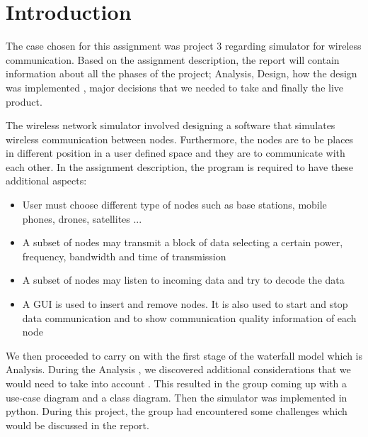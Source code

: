 \chapter{Introduction}\label{ch:introduction}

The case chosen for this assignment was project 3 regarding simulator for wireless communication. Based on the assignment description, the report will contain information about all the phases of the project; Analysis, Design, how the design was implemented , major decisions that we needed to take and finally the live product.\newline

The wireless network simulator involved designing a software that simulates wireless communication between nodes. Furthermore, the nodes are to be places in different position in a user defined space and they are to communicate with each other. In the assignment description, the program is required to have these additional aspects:
\begin{itemize}
    \item User must choose different type of nodes such as base stations, mobile phones, drones, satellites ...
    \item A subset of nodes may transmit a block of data selecting a certain power, frequency, bandwidth and time of transmission
    \item A subset of nodes may listen to incoming data and try to decode the data
    \item A GUI is used to insert and remove nodes. It is also used to start and stop data communication and to show communication quality information of each node 
\end{itemize}

We then proceeded to carry on with the first stage of the waterfall model which is Analysis. During the Analysis , we discovered additional considerations that we would need to take into account . This resulted in the group coming up with a use-case diagram and a class diagram. Then the simulator was implemented in python. During this project, the group had encountered some challenges which would be discussed in the report.







